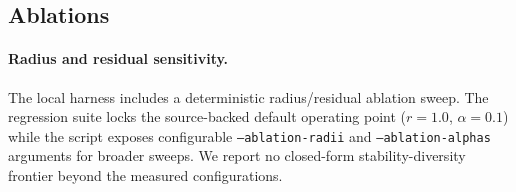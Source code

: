 \subsection{Ablations}

\paragraph{Radius and residual sensitivity.}
The local harness includes a deterministic radius/residual ablation sweep.  The
regression suite locks the source-backed default operating point ($r{=}1.0$,
$\alpha{=}0.1$) while the script exposes configurable \texttt{--ablation-radii} and
\texttt{--ablation-alphas} arguments for broader sweeps.  We report no closed-form
stability-diversity frontier beyond the measured configurations.
